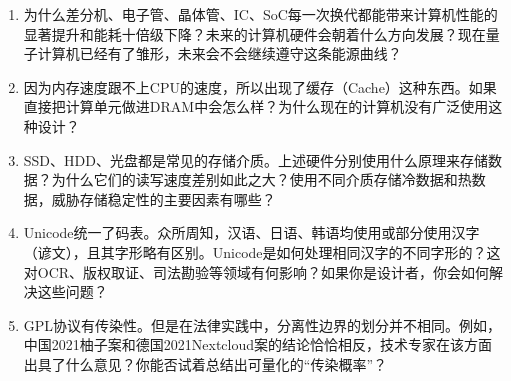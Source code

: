 \documentclass[../main.tex]{subfiles}
\begin{document}
\begin{thinking}
\begin{enumerate}
  \item 为什么差分机、电子管、晶体管、IC、SoC每一次换代都能带来计算机性能的显著提升和能耗十倍级下降？未来的计算机硬件会朝着什么方向发展？现在量子计算机已经有了雏形，未来会不会继续遵守这条能源曲线？
  \item 因为内存速度跟不上CPU的速度，所以出现了缓存（Cache）这种东西。如果直接把计算单元做进DRAM中会怎么样？为什么现在的计算机没有广泛使用这种设计？
  \item SSD、HDD、光盘都是常见的存储介质。上述硬件分别使用什么原理来存储数据？为什么它们的读写速度差别如此之大？使用不同介质存储冷数据和热数据，威胁存储稳定性的主要因素有哪些？
  \item Unicode统一了码表。众所周知，汉语、日语、韩语均使用或部分使用汉字（谚文），且其字形略有区别。Unicode是如何处理相同汉字的不同字形的？这对OCR、版权取证、司法勘验等领域有何影响？如果你是设计者，你会如何解决这些问题？
  \item GPL协议有传染性。但是在法律实践中，分离性边界的划分并不相同。例如，中国2021柚子案和德国2021Nextcloud案的结论恰恰相反，技术专家在该方面出具了什么意见？你能否试着总结出可量化的“传染概率”？
\end{enumerate}
\end{thinking}
\end{document}
